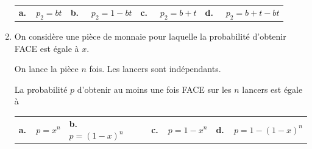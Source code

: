 \documentclass[10pt]{article}
\begin{document}
\begin{enumerate}
\begin{center}
\begin{tabularx}{\linewidth}{*{4}{X}}
\textbf{a.~~}$p_2 = bt$ &\textbf{b.~~} $p_2 = 1 - bt$ &\textbf{c.~~} $p_2 = b + t $&\textbf{d.~~} $p_2 = b + t - bt$
\end{tabularx}
\end{center}
\item On considère une pièce de monnaie pour laquelle la probabilité d'obtenir FACE est égale à $x$.

On lance la pièce $n$ fois. Les lancers sont indépendants.

La probabilité $p$ d'obtenir au moins une fois FACE sur les $n$ lancers est égale à 

\begin{center}
\begin{tabularx}{\linewidth}{*{4}{X}}
\textbf{a.~~}$p = x^n$&\textbf{b.~~} $p = (1 - x)^n$& \textbf{c.~~}$p = 1 - x^n$& \textbf{d.~~}$p = 1 - (1 - x)^n$
\end{tabularx}
\end{center}
\end{enumerate}
\end{document}
